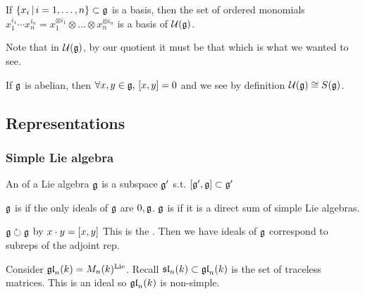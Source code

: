 \documentclass{article}
\begin{document}
\begin{remark}
If $\pbrace{x_i \, | \, i=1, \dots, n}\subset \mf{g}$ is a basis, then the set of ordered monomials $x_1^{i_1} \cdots x_n^{i_n} = x_1^{\otimes i_1} \otimes \dots \otimes x_n^{\otimes i_n}$ is a basis of $\mc{U}(\mf{g})$.
\end{remark}

\begin{remark}
Note that in $\mc{U}(\mf{g})$, by our quotient it must be that 
which is what we wanted to see. 
\end{remark}

\begin{example}
If $\mf{g}$ is abelian, then $\forall x, y \in \mf{g}, \, \comm[x]{y}=0$ and we see by definition $\mc{U}(\mf{g}) \cong S(\mf{g})$.  
\end{example}
\subsection{Representations}

\subsubsection{Simple Lie algebra}

\begin{definition}
An  of a Lie algebra $\mf{g}$ is a subspace $\mf{g}^\prime$ s.t. $\comm[\mf{g}^\prime]{\mf{g}} \subset \mf{g}^\prime $
\end{definition}

\begin{definition}
$\mf{g}$ is  if the only ideals of $\mf{g}$ are $0,\mf{g}$. $\mf{g}$ is  if it is a direct sum of simple Lie algebras. 
\end{definition}


\begin{remark}
$\mf{g} \lact \mf{g}$ by $x \cdot y = \comm[x]{y}$ This is the . Then we have ideals of $\mf{g}$ correspond to subreps of the adjoint rep. 
\end{remark}

\begin{example}
Consider $\mf{gl}_n(k) = M_n(k)^{\Lie}$. Recall $\mf{sl}_n(k) \subset \mf{gl}_n(k)$ is the set of traceless matrices. This is an ideal so $\mf{gl}_n(k)$ is non-simple.
\end{example}
\end{document}
